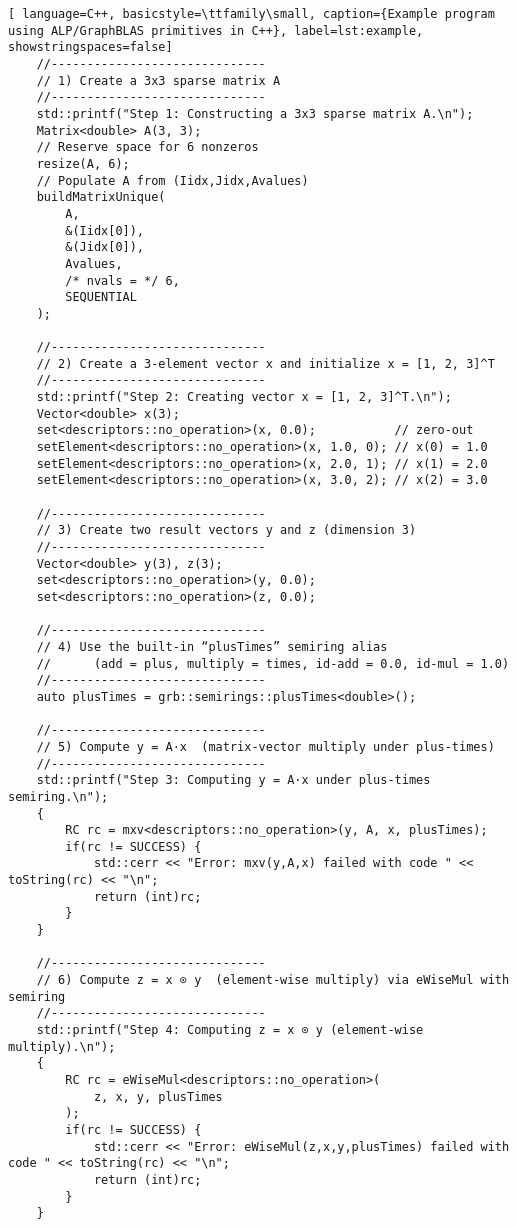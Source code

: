 \begin{lstlisting}[ language=C++, basicstyle=\ttfamily\small, caption={Example program using ALP/GraphBLAS primitives in C++}, label=lst:example, showstringspaces=false]
    //------------------------------
    // 1) Create a 3x3 sparse matrix A
    //------------------------------
    std::printf("Step 1: Constructing a 3x3 sparse matrix A.\n");
    Matrix<double> A(3, 3);
    // Reserve space for 6 nonzeros
    resize(A, 6);
    // Populate A from (Iidx,Jidx,Avalues)
    buildMatrixUnique(
        A,
        &(Iidx[0]),
        &(Jidx[0]),
        Avalues,
        /* nvals = */ 6,
        SEQUENTIAL
    );

    //------------------------------
    // 2) Create a 3-element vector x and initialize x = [1, 2, 3]^T
    //------------------------------
    std::printf("Step 2: Creating vector x = [1, 2, 3]^T.\n");
    Vector<double> x(3);
    set<descriptors::no_operation>(x, 0.0);           // zero-out
    setElement<descriptors::no_operation>(x, 1.0, 0); // x(0) = 1.0
    setElement<descriptors::no_operation>(x, 2.0, 1); // x(1) = 2.0
    setElement<descriptors::no_operation>(x, 3.0, 2); // x(2) = 3.0

    //------------------------------
    // 3) Create two result vectors y and z (dimension 3)
    //------------------------------
    Vector<double> y(3), z(3);
    set<descriptors::no_operation>(y, 0.0);
    set<descriptors::no_operation>(z, 0.0);

    //------------------------------
    // 4) Use the built-in “plusTimes” semiring alias
    //      (add = plus, multiply = times, id‐add = 0.0, id-mul = 1.0)
    //------------------------------
    auto plusTimes = grb::semirings::plusTimes<double>();

    //------------------------------
    // 5) Compute y = A·x  (matrix‐vector multiply under plus‐times)
    //------------------------------
    std::printf("Step 3: Computing y = A·x under plus‐times semiring.\n");
    {
        RC rc = mxv<descriptors::no_operation>(y, A, x, plusTimes);
        if(rc != SUCCESS) {
            std::cerr << "Error: mxv(y,A,x) failed with code " << toString(rc) << "\n";
            return (int)rc;
        }
    }

    //------------------------------
    // 6) Compute z = x ⊙ y  (element‐wise multiply) via eWiseMul with semiring
    //------------------------------
    std::printf("Step 4: Computing z = x ⊙ y (element‐wise multiply).\n");
    {
        RC rc = eWiseMul<descriptors::no_operation>(
            z, x, y, plusTimes
        );
        if(rc != SUCCESS) {
            std::cerr << "Error: eWiseMul(z,x,y,plusTimes) failed with code " << toString(rc) << "\n";
            return (int)rc;
        }
    }
    

\end{lstlisting}
